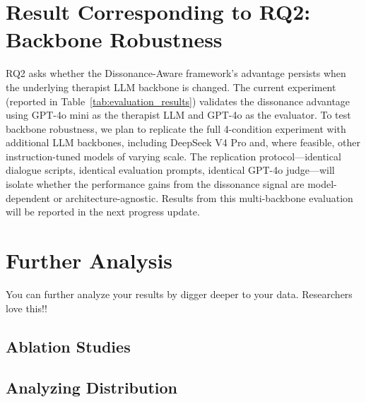 \section{Result Corresponding to RQ2: Backbone Robustness}

RQ2 asks whether the Dissonance-Aware framework's advantage persists when the underlying therapist LLM backbone is changed. The current experiment (reported in Table~\ref{tab:evaluation_results}) validates the dissonance advantage using GPT-4o mini as the therapist LLM and GPT-4o as the evaluator. To test backbone robustness, we plan to replicate the full 4-condition experiment with additional LLM backbones, including DeepSeek V4 Pro and, where feasible, other instruction-tuned models of varying scale. The replication protocol---identical dialogue scripts, identical evaluation prompts, identical GPT-4o judge---will isolate whether the performance gains from the dissonance signal are model-dependent or architecture-agnostic. Results from this multi-backbone evaluation will be reported in the next progress update.

\section{Further Analysis}
You can further analyze your results by digger deeper to your data.  Researchers love this!!
\subsection{Ablation Studies}
\subsection{Analyzing Distribution}
